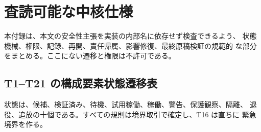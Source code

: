 \section{査読可能な中核仕様}\label{sec:appendix:specification}

本付録は、本文の安全性主張を実装の内部名に依存せず検査できるよう、
状態機械、権限、記録、再開、責任帰属、影響修復、最終原稿検証の規範的
な部分をまとめる。ここにない遷移と権限は不許可である。

\subsection{T1--T21 の構成要素状態遷移表}\label{sec:appendix:transitions}

状態は、候補、検証済み、待機、試用稼働、稼働、警告、保護観察、隔離、
退役、追放の十個である。すべての規則は境界取引で確定し、T16 は直ちに
緊急境界を作る。

